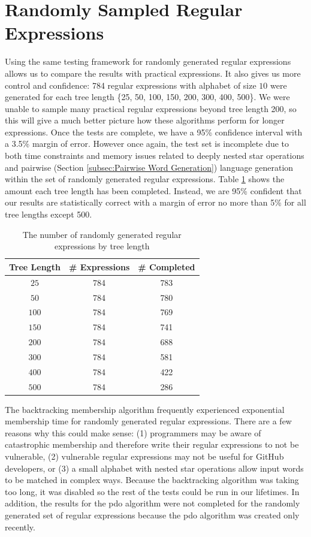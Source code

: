 \section{Randomly Sampled Regular Expressions}
\label{sec:Randomly Sampled Regular Expressions}
Using the same testing framework for randomly generated regular expressions allows us to compare the results with practical expressions. It also gives us more control and confidence: 784 regular expressions with alphabet of size $10$ were generated for each tree length \{25, 50, 100, 150, 200, 300, 400, 500\}. We were unable to sample many practical regular expressions beyond tree length 200, so this will give a much better picture how these algorithms perform for longer expressions. Once the tests are complete, we have a 95\% confidence interval with a 3.5\% margin of error. However once again, the test set is incomplete due to both time constraints and memory issues related to deeply nested star operations and pairwise (Section \ref{subsec:Pairwise Word Generation}) language generation within the set of randomly generated regular expressions. Table \ref{tbl:random sample by tree length} shows the amount each tree length has been completed. Instead, we are 95\% confident that our results are statistically correct with a margin of error no more than 5\% for all tree lengths except 500.

\begin{table}[H]
  \center
  \begin{tabular}{c|c|c}
    Tree Length & \# Expressions & \# Completed \\
    \hline
    $25$    & 784 & 783 \\
    $50$    & 784 & 780 \\
    $100$   & 784 & 769 \\
    $150$   & 784 & 741 \\
    $200$   & 784 & 688 \\
    $300$   & 784 & 581 \\
    $400$   & 784 & 422 \\
    $500$   & 784 & 286
  \end{tabular}
  \caption{The number of randomly generated regular expressions by tree length}
  \label{tbl:random sample by tree length}
\end{table}

The backtracking membership algorithm frequently experienced exponential membership time for randomly generated regular expressions. There are a few reasons why this could make sense: (1) programmers may be aware of catastrophic membership and therefore write their regular expressions to not be vulnerable, (2) vulnerable regular expressions may not be useful for GitHub developers, or (3) a small alphabet with nested star operations allow input words to be matched in complex ways. Because the backtracking algorithm was taking too long, it was disabled so the rest of the tests could be run in our lifetimes. In addition, the results for the pdo algorithm were not completed for the randomly generated set of regular expressions because the pdo algorithm was created only recently.

